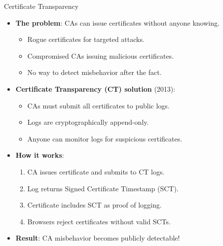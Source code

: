 \documentclass[aspectratio=169, lualatex, handout]{beamer}
\begin{document}
\begin{frame}{Certificate Transparency}
	\begin{itemize}[<+->]
		\item \textbf{The problem}: CAs can issue certificates without anyone knowing.
		      \begin{itemize}
			      \item Rogue certificates for targeted attacks.
			      \item Compromised CAs issuing malicious certificates.
			      \item No way to detect misbehavior after the fact.
		      \end{itemize}
		\item \textbf{Certificate Transparency (CT) solution} (2013):
		      \begin{itemize}
			      \item CAs must submit all certificates to public logs.
			      \item Logs are cryptographically append-only.
			      \item Anyone can monitor logs for suspicious certificates.
		      \end{itemize}
		\item \textbf{How it works}:
		      \begin{enumerate}
			      \item CA issues certificate and submits to CT logs.
			      \item Log returns Signed Certificate Timestamp (SCT).
			      \item Certificate includes SCT as proof of logging.
			      \item Browsers reject certificates without valid SCTs.
		      \end{enumerate}
		\item \textbf{Result}: CA misbehavior becomes publicly detectable!
	\end{itemize}
\end{frame}
\end{document}
